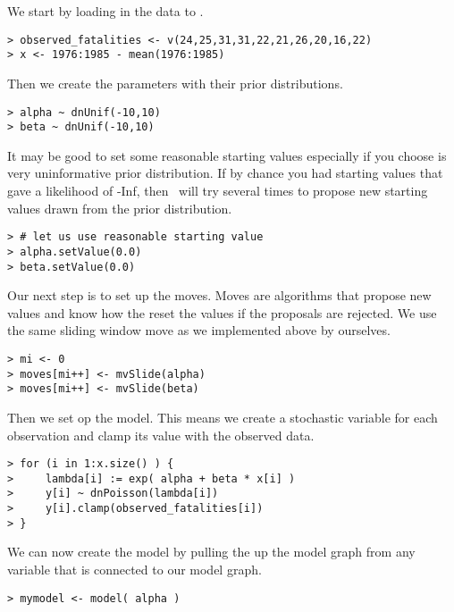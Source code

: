 We start by loading in the data to \RevBayes.
{\tt \begin{snugshade*}
\begin{lstlisting} 
> observed_fatalities <- v(24,25,31,31,22,21,26,20,16,22)
> x <- 1976:1985 - mean(1976:1985)
\end{lstlisting}
\end{snugshade*}}
Then we create the parameters with their prior distributions.
{\tt \begin{snugshade*}
\begin{lstlisting} 
> alpha ~ dnUnif(-10,10) 
> beta ~ dnUnif(-10,10)
\end{lstlisting}
\end{snugshade*}}
It may be good to set some reasonable starting values especially if you choose is very uninformative prior distribution.
If by chance you had starting values that gave a likelihood of -Inf, then \RevBayes~will try several times to propose new starting values drawn from the prior distribution.
{\tt \begin{snugshade*}
\begin{lstlisting} 
> # let us use reasonable starting value
> alpha.setValue(0.0)
> beta.setValue(0.0)
\end{lstlisting}
\end{snugshade*}}
Our next step is to set up the moves.
Moves are algorithms that propose new values and know how the reset the values if the proposals are rejected.
We use the same sliding window move as we implemented above by ourselves.
{\tt \begin{snugshade*}
\begin{lstlisting} 
> mi <- 0
> moves[mi++] <- mvSlide(alpha)
> moves[mi++] <- mvSlide(beta)
\end{lstlisting}
\end{snugshade*}}
Then we set op the model.
This means we create a stochastic variable for each observation and clamp its value with the observed data.
{\tt \begin{snugshade*}
\begin{lstlisting} 
> for (i in 1:x.size() ) {
>     lambda[i] := exp( alpha + beta * x[i] )
>     y[i] ~ dnPoisson(lambda[i])
>     y[i].clamp(observed_fatalities[i])
> }
\end{lstlisting}
\end{snugshade*}}
We can now create the model by pulling the up the model graph from any variable that is connected to our model graph.
{\tt \begin{snugshade*}
\begin{lstlisting} 
> mymodel <- model( alpha )
\end{lstlisting}
\end{snugshade*}}
